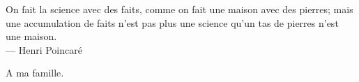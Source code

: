 \thispagestyle{empty}
{}

\vspace*{3cm}

\begin{center}
On fait la science avec des faits, comme on fait une maison avec des pierres; mais une accumulation de faits n'est pas plus une science qu'un tas de pierres n'est une maison. \\ \medskip
--- Henri Poincaré 
\end{center}

\vspace*{6cm}

\begin{flushright}
A ma famille.
\end{flushright}

